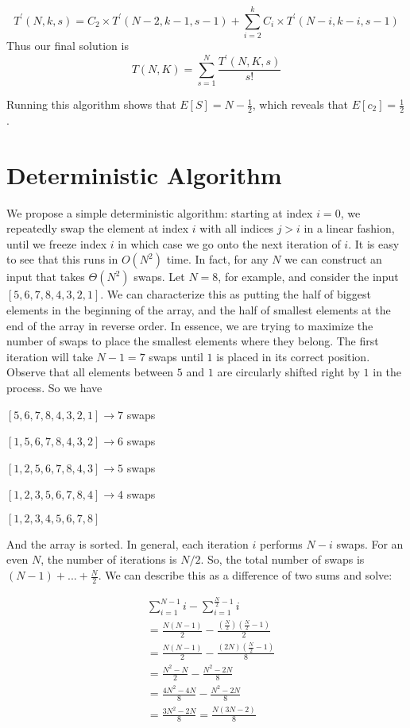 \documentclass{article}
\begin{document}
\[ T^\prime(N, k, s) =
C_2 \times T^\prime(N - 2, k - 1, s-1) +
\sum_{i = 2}^{k}{C_i \times T^\prime(N-i, k-i, s-1)} \]
Thus our final solution is
\[ T(N, K) = \sum_{s = 1}^{N}{\frac{T^\prime(N, K, s)}{s!}} \]

Running this algorithm shows that $E[S] = N - \frac{1}{2}$, which reveals that $E[c_2] = \frac{1}{2}$.

\section{Deterministic Algorithm}
We propose a simple deterministic algorithm: starting at index $i = 0$, we repeatedly swap the element
at index $i$ with all indices $j > i$ in a linear fashion, until we freeze index $i$ in which case we go onto the 
next iteration of $i$. It is easy to see that this runs in $O(N^2)$ time. In fact, for any $N$ we can construct an input
that takes $\Theta(N^2)$ swaps. Let $N = 8$, for example, and consider the input $[5, 6, 7, 8, 4, 3, 2, 1]$.
We can characterize this as putting the half of biggest elements in the beginning of the array, and the half of smallest elements at
the end of the array in reverse order. In essence, we are trying to maximize the number of swaps to place the smallest
elements where they belong.
The first iteration will take $N - 1 = 7$ swaps until $1$ is placed in its correct position. Observe that all elements
between $5$ and $1$ are circularly shifted right by $1$ in the process. So we have

$[5, 6, 7, 8, 4, 3, 2, 1] \rightarrow 7$ swaps

$[1, 5, 6, 7, 8, 4, 3, 2] \rightarrow 6$ swaps

$[1, 2, 5, 6, 7, 8, 4, 3] \rightarrow 5$ swaps

$[1, 2, 3, 5, 6, 7, 8, 4] \rightarrow 4$ swaps

$[1, 2, 3, 4, 5, 6, 7, 8]$

And the array is sorted. In general, each iteration $i$ performs $N - i$ swaps.
For an even $N$, the number of iterations is $N / 2$. So, the total number of swaps is
$(N - 1) + ... + \frac{N}{2}$. We can describe this as a difference of two sums and solve:

\begin{align}
    & \sum_{i = 1}^{N - 1}{i} - \sum_{i = 1}^{\frac{N}{2} - 1}{i}  \\\nonumber
    &= \frac{N(N-1)}{2} - \frac{(\frac{N}{2})(\frac{N}{2} - 1)}{2} \\\nonumber
    &= \frac{N(N-1)}{2} - \frac{(2N)(\frac{N}{2} - 1)}{8} \\\nonumber
    &= \frac{N^2 - N}{2} - \frac{N^2 - 2N}{8} \\\nonumber
    &= \frac{4N^2 - 4N}{8} - \frac{N^2 - 2N}{8} \\\nonumber
    &= \frac{3N^2 - 2N}{8} = \frac{N(3N - 2)}{8} \\\nonumber
\end{align}
\end{document}
